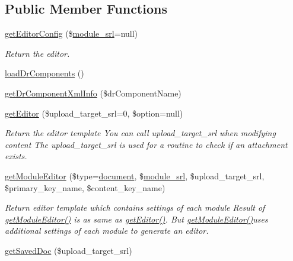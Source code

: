 \subsection*{Public Member Functions}
\begin{DoxyCompactItemize}
\item 
\hyperlink{classeditorModel_a66f732bbdd500d31fb39fd03eb8d46b5}{get\+Editor\+Config} (\$\hyperlink{ko_8install_8php_a370bb6450fab1da3e0ed9f484a38b761}{module\+\_\+srl}=null)
\begin{DoxyCompactList}\small\item\em Return the editor. \end{DoxyCompactList}\item 
\hyperlink{classeditorModel_a1ad866d4c1ab454b9d0b72c8d3cc29bd}{load\+Dr\+Components} ()
\item 
\hyperlink{classeditorModel_a580e31ed0fff869a97d5fe598975e960}{get\+Dr\+Component\+Xml\+Info} (\$dr\+Component\+Name)
\item 
\hyperlink{classeditorModel_a77477c0a6d333b3230f77904d96d93c5}{get\+Editor} (\$upload\+\_\+target\+\_\+srl=0, \$option=null)
\begin{DoxyCompactList}\small\item\em Return the editor template You can call upload\+\_\+target\+\_\+srl when modifying content The upload\+\_\+target\+\_\+srl is used for a routine to check if an attachment exists. \end{DoxyCompactList}\item 
\hyperlink{classeditorModel_af2b57078eb05b65c0094d5dac0186ca5}{get\+Module\+Editor} (\$type=\textquotesingle{}\hyperlink{classdocument}{document}\textquotesingle{}, \$\hyperlink{ko_8install_8php_a370bb6450fab1da3e0ed9f484a38b761}{module\+\_\+srl}, \$upload\+\_\+target\+\_\+srl, \$primary\+\_\+key\+\_\+name, \$content\+\_\+key\+\_\+name)
\begin{DoxyCompactList}\small\item\em Return editor template which contains settings of each module Result of \hyperlink{classeditorModel_af2b57078eb05b65c0094d5dac0186ca5}{get\+Module\+Editor()} is as same as \hyperlink{classeditorModel_a77477c0a6d333b3230f77904d96d93c5}{get\+Editor()}. But \hyperlink{classeditorModel_af2b57078eb05b65c0094d5dac0186ca5}{get\+Module\+Editor()}uses additional settings of each module to generate an editor. \end{DoxyCompactList}\item 
\hyperlink{classeditorModel_af9c4c2f7ba2d377b087cac08412b0baa}{get\+Saved\+Doc} (\$upload\+\_\+target\+\_\+srl)

\end{DoxyCompactItemize}
